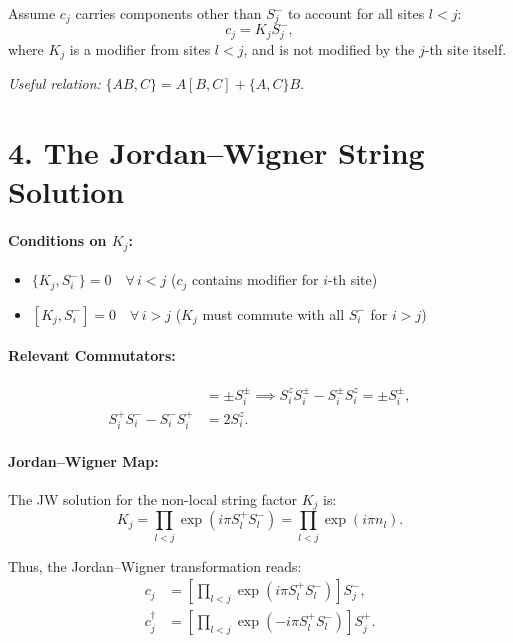 \documentclass[11pt,a4paper]{article}
\begin{document}
Assume $c_j$ carries components other than $S_j^-$ to account for all sites $l < j$:
\begin{equation}
    c_j = K_j S_j^-,
\end{equation}
where $K_j$ is a modifier from sites $l < j$, and is not modified by the $j$-th site itself.

\textit{Useful relation:} $\{AB, C\} = A[B, C] + \{A, C\}B$.


\section*{4. The Jordan--Wigner String Solution}

\paragraph{Conditions on $K_j$:}
\begin{itemize}
    \item $\{K_j, S_i^-\} = 0 \quad \forall\, i < j$ ($c_j$ contains modifier for $i$-th site)
    \item $[K_j, S_i^-] = 0 \quad \forall\, i > j$ ($K_j$ must commute with all $S_i^-$ for $i > j$)
\end{itemize}

\paragraph{Relevant Commutators:}
\begin{align}
    [S_i^z, S_i^\pm] &= \pm S_i^\pm \implies S_i^z S_i^\pm - S_i^\pm S_i^z = \pm S_i^\pm, \\
    S_i^+ S_i^- - S_i^- S_i^+ &= 2 S_i^z.
\end{align}

\paragraph{Jordan--Wigner Map:}
The JW solution for the non-local string factor $K_j$ is:
\begin{equation}
    K_j = \prod_{l < j} \exp\left(i \pi S_l^+ S_l^-\right) = \prod_{l < j} \exp\left(i \pi n_l\right).
\end{equation}

Thus, the Jordan--Wigner transformation reads:
\begin{align}
    c_j &= \left[ \prod_{l < j} \exp\left(i \pi S_l^+ S_l^-\right) \right] S_j^-, \\
    c_j^\dagger &= \left[ \prod_{l < j} \exp\left(-i \pi S_l^+ S_l^-\right) \right] S_j^+.
\end{align}
\end{document}
